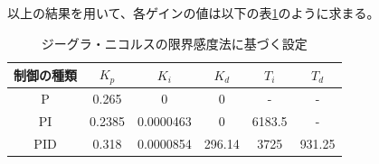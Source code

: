 \documentclass[a4j]{ujarticle}
\begin{document}
以上の結果を用いて、各ゲインの値は以下の表\ref{table:Ziegler-Nichols_setting}のように求まる。
\begin{table}[]
  \centering
  \caption{ジーグラ・ニコルスの限界感度法に基づく設定}
  \label{table:Ziegler-Nichols_setting}
  \begin{tabular}{c|c|c|c|c|c}
    \hline
    制御の種類  & $K_p$ & $K_i$ & $K_d$ &$T_i$&$T_d$  \\\hline \hline
    P & 0.265 & 0 & 0 & - & - \\
    PI & 0.2385 & 0.0000463 & 0 & 6183.5 & -\\
    PID & 0.318 & 0.0000854 & 296.14 & 3725 & 931.25 \\\hline
  \end{tabular}
\end{table}
\end{document}
